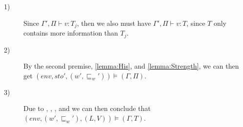 \begin{description}
	\item[1)] Since $\Gamma',\Pi\vdash v:T_j$, then we also must have $\Gamma',\Pi\vdash v:T$, since $T$ only contains more information than $T_j$.
	\item[2)] By the second premise, \cref{lemma:His}, and \cref{lemma:Strength}, we can then get $(env,sto',(w',\sqsubseteq_w'))\models(\Gamma,\Pi)$.
	\item[3)] Due to , , , and  we can then conclude that $(env,(w',\sqsubseteq_w'),(L,V))\models(\Gamma,T)$.
\end{description}
